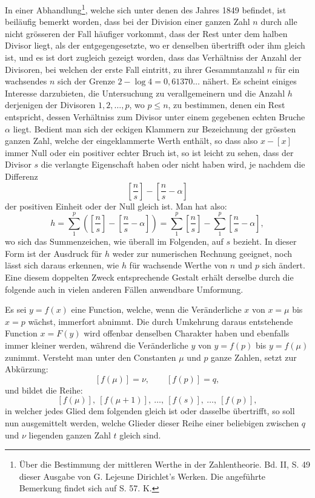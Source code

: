 \documentclass[11pt]{article}
\newcommand{\floor}[1]{\left[#1\right]}
\begin{document}
In einer Abhandlung\footnote{Über die Bestimmung der mittleren Werthe in der Zahlentheorie. Bd. II, S. 49 dieser Ausgabe von G. Lejeune Dirichlet's Werken. Die angeführte Bemerkung findet sich auf S. 57. K.}, welche sich unter denen des Jahres 1849 befindet, ist beiläufig bemerkt worden, dass bei der Division einer ganzen Zahl $n$ durch alle nicht grösseren der Fall häufiger vorkommt, dass der Rest unter dem halben Divisor liegt, als der entgegengesetzte, wo er denselben übertrifft oder ihm gleich ist, und es ist dort zugleich gezeigt worden, dass das Verhältniss der Anzahl der Divisoren, bei welchen der erste Fall eintritt, zu ihrer Gesammtanzahl $n$ für ein wachsendes $n$ sich der Grenze $2-\log 4=0{,}61370\ldots$ nähert. Es scheint einiges Interesse darzubieten, die Untersuchung zu verallgemeinern und die Anzahl $h$ derjenigen der Divisoren $1,2,\ldots,p$, wo $p\leq n$, zu bestimmen, denen ein Rest entspricht, dessen Verhältniss zum Divisor unter einem gegebenen echten Bruche $\alpha$ liegt. Bedient man sich der eckigen Klammern zur Bezeichnung der grössten ganzen Zahl, welche der eingeklammerte Werth enthält, so dass also $x-\floor{x}$ immer Null oder ein positiver echter Bruch ist, so ist leicht zu sehen, dass der Divisor $s$ die verlangte Eigenschaft haben oder nicht haben wird, je nachdem die Differenz
\[
 \floor{\frac ns}-\floor{\frac ns-\alpha}
\]
der positiven Einheit oder der Null gleich ist. Man hat also:
\[
 h=\sum_{1}^{p}\left(\floor{\frac ns}-\floor{\frac ns-\alpha}\right)
  =\sum_{1}^{p}\floor{\frac ns}-\sum_{1}^{p}\floor{\frac ns-\alpha},
\]
wo sich das Summenzeichen, wie überall im Folgenden, auf $s$ bezieht. In dieser Form ist der Ausdruck für $h$ weder zur numerischen Rechnung geeignet, noch lässt sich daraus erkennen, wie $h$ für wachsende Werthe von $n$ und $p$ sich ändert. Eine diesem doppelten Zweck entsprechende Gestalt erhält derselbe durch die folgende auch in vielen anderen Fällen anwendbare Umformung.

Es sei $y=f(x)$ eine Function, welche, wenn die Veränderliche $x$ von $x=\mu$ bis $x=p$ wächst, immerfort abnimmt. Die durch Umkehrung daraus entstehende Function $x=F(y)$ wird offenbar denselben Charakter haben und ebenfalls immer kleiner werden, während die Veränderliche $y$ von $y=f(p)$ bis $y=f(\mu)$ zunimmt. Versteht man unter den Constanten $\mu$ und $p$ ganze Zahlen, setzt zur Abkürzung:
\[
 [f(\mu)]=\nu,\qquad [f(p)]=q,
\]
und bildet die Reihe:
\[
 [f(\mu)],\ [f(\mu+1)],\ \ldots,\ [f(s)],\ \ldots,\ [f(p)],
\]
in welcher jedes Glied dem folgenden gleich ist oder dasselbe übertrifft, so soll nun ausgemittelt werden, welche Glieder dieser Reihe einer beliebigen zwischen $q$ und $\nu$ liegenden ganzen Zahl $t$ gleich sind.
\end{document}

